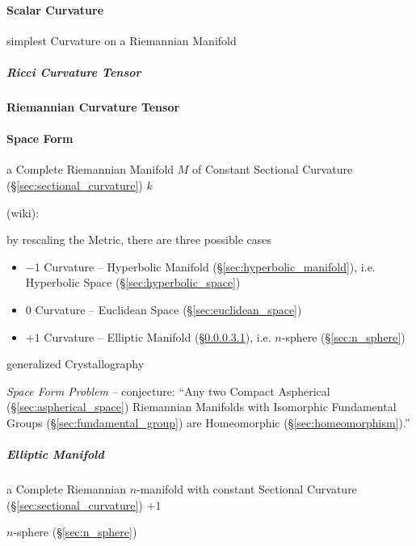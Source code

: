 \paragraph{Scalar Curvature}\label{sec:scalar_curvature}\hfill

simplest Curvature on a Riemannian Manifold



\subparagraph{Ricci Curvature Tensor}\label{sec:ricci_curvature}\hfill



\paragraph{Riemannian Curvature Tensor}\label{sec:riemannian_curvature}\hfill

\paragraph{Space Form}\label{sec:space_form}\hfill

a Complete Riemannian Manifold $M$ of Constant Sectional Curvature
(\S\ref{sec:sectional_curvature}) $k$

(wiki):

by rescaling the Metric, there are three possible cases
\begin{itemize}
  \item $-1$ Curvature -- Hyperbolic Manifold (\S\ref{sec:hyperbolic_manifold}),
    i.e. Hyperbolic Space (\S\ref{sec:hyperbolic_space})
  \item $0$ Curvature -- Euclidean Space (\S\ref{sec:euclidean_space})
  \item $+1$ Curvature -- Elliptic Manifold (\S\ref{sec:elliptic_manifold}),
    i.e. $n$-sphere (\S\ref{sec:n_sphere})
\end{itemize}

generalized Crystallography

\emph{Space Form Problem} -- conjecture: ``Any two Compact Aspherical
(\S\ref{sec:aspherical_space}) Riemannian Manifolds with Isomorphic Fundamental
Groups (\S\ref{sec:fundamental_group}) are Homeomorphic
(\S\ref{sec:homeomorphism}).''



\subparagraph{Elliptic Manifold}\label{sec:elliptic_manifold}\hfill

a Complete Riemannian $n$-manifold with constant Sectional Curvature
(\S\ref{sec:sectional_curvature}) $+1$

$n$-sphere (\S\ref{sec:n_sphere})

